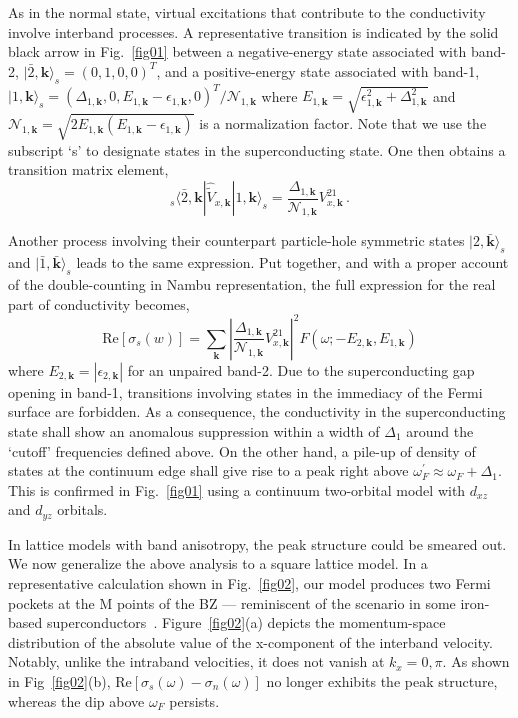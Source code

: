 \documentclass[prl,floatfix,twocolumn,showpacs,amsmath,superscriptaddress]{revtex4-2}
\renewcommand{\vec}[1]{\mathbf{#1}}
\newcommand{\vk}{{\vec{k}}}
\begin{document}
As in the normal state, virtual excitations that contribute to the conductivity involve interband processes. A representative transition is indicated by the solid black arrow in Fig.~\ref{fig01} between a negative-energy state associated with band-2, $|\bar{2}, \vk \rangle_s = (0,1,0,0)^T$, and a positive-energy state associated with band-1, $|1,\vk \rangle_s = (\Delta_{1,\vk},0,E_{1,\vk}-\epsilon_{1,\vk},0)^T/\mathcal{N}_{1,\vk}$ where $E_{1,\vk} = \sqrt{\epsilon_{1,\vk}^2+\Delta_{1,\vk}^2}$ and $\mathcal{N}_{1,\vk}=\sqrt{2E_{1,\vk}(E_{1,\vk}-\epsilon_{1,\vk})}$ is a normalization factor. Note that we use the subscript `s' to designate states in the superconducting state. One then obtains a transition matrix element,
\begin{equation}
	_s\langle \bar{2},\vk| \hat{\widetilde{V}}_{x,\vk}  | 1,\vk \rangle_s=\frac{\Delta_{1,\vk}}{\mathcal{N}_{1,\vk}} V_{x,\vk}^{21} \,.
\end{equation}

Another process involving their counterpart particle-hole symmetric states $|2,\bar{\vk}\rangle_s$ and $|\bar{1},\bar{\vk}\rangle_s$ leads to the same expression. Put together, and with a proper account of the double-counting in Nambu representation, the full expression for the real part of conductivity becomes,
\begin{equation}
	\text{Re} [\sigma_s(w)] =\sum_{\vk} \left|\frac{\Delta_{1,\vk}}{\mathcal{N}_{1,\vk}} V_{x,\vk}^{21} \right|^2 F(\omega;-E_{2,\vk},E_{1,\vk})
\end{equation}
where $E_{2,\vk}=|\epsilon_{2,\vk}|$ for an unpaired band-2. Due to the superconducting gap opening in band-1, transitions involving states in the immediacy of the Fermi surface are forbidden. As a consequence, the conductivity in the superconducting state shall show an anomalous suppression within a width of $\Delta_1$ around the `cutoff' frequencies defined above. On the other hand, a pile-up of density of states at the continuum edge shall give rise to a peak right above $\omega_F^\prime \approx \omega_F+\Delta_1$. This is confirmed in Fig.~\ref{fig01} using a continuum two-orbital model with $d_{xz}$ and $d_{yz}$ orbitals. 

In lattice models with band anisotropy, the peak structure could be smeared out. We now generalize the above analysis to a square lattice model. In a representative calculation shown in Fig.~\ref{fig02}, our model produces two Fermi pockets at the M points of the BZ --- reminiscent of the scenario in some iron-based superconductors~\cite{Fn1}. Figure~\ref{fig02}(a) depicts the momentum-space distribution of the absolute value of the x-component of the interband velocity. Notably, unlike the intraband velocities, it does not vanish at $k_x=0, \pi$. As shown in Fig~\ref{fig02}(b), $\text{Re}[\sigma_s(\omega)-\sigma_n(\omega)]$ no longer exhibits the peak structure, whereas the dip above $\omega_F$ persists. 
\end{document}
